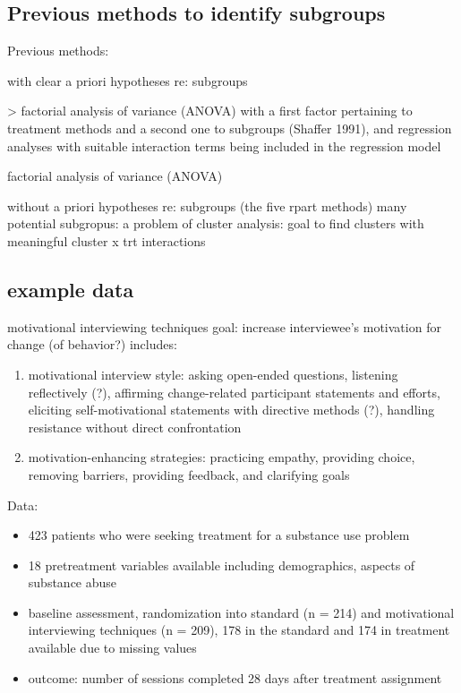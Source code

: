 \documentclass[10pt]{article}
\begin{document}
\subsection*{Previous methods to identify subgroups} %
\label{sub:subsection_name}

Previous methods:

with clear a priori hypotheses re: subgroups

> factorial analysis of variance (ANOVA) with a first factor pertaining to treatment methods and a second one to subgroups (Shaffer 1991), and regression analyses with suitable interaction terms being included in the regression model

factorial analysis of variance (ANOVA)

without a priori hypotheses re: subgroups (the five rpart methods)
many potential subgropus: a problem of cluster analysis: goal to find clusters with meaningful cluster x trt interactions


\subsection*{example data} %
\label{sub:example_data}

motivational interviewing techniques
goal: increase interviewee's motivation for change (of behavior?)
includes:
\begin{enumerate}
  \item motivational interview style: asking open-ended questions, listening reflectively (?), affirming change-related participant statements and efforts, eliciting self-motivational statements with directive methods (?), handling resistance without direct confrontation
  \item motivation-enhancing strategies: practicing empathy, providing choice, removing barriers, providing feedback, and clarifying goals
\end{enumerate}

Data:
\begin{itemize}
  \item 423 patients who were seeking treatment for a substance use problem
  
  \item 18 pretreatment variables available including demographics, aspects of substance abuse
  \item baseline assessment, randomization into standard (n = 214) and motivational interviewing techniques (n = 209), 178 in the standard and 174 in treatment available due to missing values
  \item outcome: number of sessions completed 28 days after treatment assignment
\end{itemize}
\end{document}
